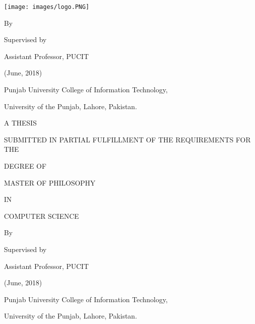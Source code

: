 


\begin{center}
\Large{\textbf{}}

\end{center}
\bigskip

\begin{center}
    

\texttt{[image: images/logo.PNG]}
\end{center}

\begin{center}
    

    By
    
\bigskip    
\large{\textbf{}}

\bigskip
\large{}

\bigskip
Supervised by

\bigskip
\large{\textbf{}}


\bigskip
Assistant Professor, PUCIT

\bigskip
(June, 2018)

\bigskip
Punjab University College of Information Technology,

\bigskip
University of the Punjab, Lahore, Pakistan. 

\end{center}

\newpage
\begin{center}
\Large{\textbf{}}



A THESIS

SUBMITTED IN PARTIAL FULFILLMENT OF THE REQUIREMENTS FOR THE 

DEGREE OF

MASTER OF PHILOSOPHY

IN

COMPUTER SCIENCE

\bigskip

    By
    
\large{\textbf{}}

\large{}

\bigskip
Supervised by

\large{\textbf{}}

Assistant Professor, PUCIT




\bigskip
(June, 2018)

\bigskip
Punjab University College of Information Technology,

\bigskip
University of the Punjab, Lahore, Pakistan. 

\end{center}
\bigskip


